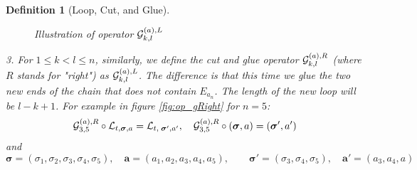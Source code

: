 \documentclass[10pt,reqno]{article}
\theoremstyle{plain} %
\newtheorem{definition}[theorem]{Definition}
\theoremstyle{remark}
\numberwithin{equation}{section}
\begin{document}
\begin{definition}[Loop, Cut, and Glue]
\begin{figure}[ht]
{
    }
        \caption{Illustration of operator ${\cal G}^{(a), L}_{k, l}$}
        \label{fig:op_gLeft}
    \end{figure}

  \noindent 
 \emph{3.}  For $1 \le k < l \le n$, similarly, we define the cut and glue operator ${\cal G}^{(a), R}_{k, l}$ (where $R$ stands for "right") as ${\cal G}^{(a), L}_{k, l}$. The difference is that this time we glue the two new ends of the chain that does not contain $E_{a_n}$. The length of the new loop will be $l - k + 1$. For example in figure \ref{fig:op_gRight} for $n=5$:
      $$
    {\cal G}^{(a), R}_{3, 5} \circ {\cal L}_{t, \boldsymbol{\sigma}, \textbf{a}} = {\cal L}_{t, \; \boldsymbol{\sigma}', \textbf{a}'}, \quad 
     {\cal G}^{(a), R}_{3, 5}\circ\left(\boldsymbol{\sigma}, \textbf{a}\right)=\left(\boldsymbol{\sigma}', \textbf{a}'\right)
    $$
   and  $$
  \boldsymbol{\sigma}=(\sigma_1,\sigma_2,\sigma_3,\sigma_4,\sigma_5),\quad 
   \textbf{a}= (a_1,a_2,a_3,a_4,a_5),\quad \quad   \boldsymbol{\sigma}' = (\sigma_3, \sigma_4, \sigma_5), \quad \textbf{a}' = (a_3, a_4, a)
    $$
    \begin{figure}[ht]
        \centering
\end{figure}
\end{definition}
\end{document}
